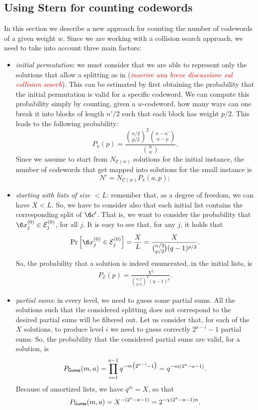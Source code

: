 \subsection{Using Stern for counting codewords}
In this section we describe a new approach for counting the number of codewords of a given weight $w$. Since we are working with a collision search approach, we need to take into account three main factors:
\begin{itemize}
    \item \textit{initial permutation}: we must consider that we are able to represent only the solutions that allow a splitting as in (\emph{\textcolor{red}{inserire una breve discussione sul collision search}}).
    This can be estimated by first obtaining the probability that the initial permutation is valid for a specific codeword. We can compute this probability simply by counting, given a $w$-codeword, how many ways can one break it into blocks of length $n'/2$ such that each block has weight $p/2$. This leads to the following probability:
    \begin{equation}
    P_\pi(p) = \frac{\binom{n/2}{p/2}^{2}\binom{n-n'}{w-p}}{\binom{n}{w}}.
    \end{equation}
    Since we assume to start from $N_{\mathcal{C}(w)}$ solutions for the initial instance, the number of codewords that get mapped into solutions for the small instance is $$N' = N_{\mathcal{C}(w)} P_\pi(a,p);$$
    \item \textit{starting with lists of size $<L$}: remember that, as a degree of freedom, we can have $X<L$. 
    So, we have to consider also that each initial list contains the corresponding split of $\6c'$.
    That is, we want to consider the probability that $\6x^{(0)}_j\in\mathcal E_j^{(0)}$, for all $j$.
    It is easy to see that, for any $j$, it holds that
    \begin{equation}
    \mathrm{Pr}\left[\6x^{(0)}_j\in \mathcal E_j^{(0)}\right] = \frac{X}{L} = \frac{X}{\binom{n/2}{p/2}(q-1)^{p/2}}.
    \end{equation}
    So, the probability that a solution is indeed enumerated, in the initial lists, is
    \begin{align}
    P_{\mathcal E}(p) = \frac{X^{2}}{\binom{n/2}{p/2}^{2}(q-1)^p}.
    \end{align}
    \item \textit{partial sums}: in every level, we need to guess some partial sums.
    All the solutions such that the considered splitting does not correspond to the desired partial sums will be filtered out.
    Let us consider that, for each of the $X$ solutions, to produce level $i$ we need to guess correctly $2^{a-i}-1$ partial sums.
    So, the probability that the considered partial sums are valid, for a solution, is
    \begin{align*}
    P_{\sf{Guess}}(m,a) = \prod_{i = 1}^{a-1}q^{-m\big(2^{a-i}-1\big)} = q^{-m(2^a-a-1)}.
    \end{align*}
    Because of amortized lists, we have $q^m = X$, so that
    $$P_{\sf{Guess}}(m,a) = X^{-(2^a-a-1)} = 2^{-\chi(2^a-a-1)n}.$$
\end{itemize}
